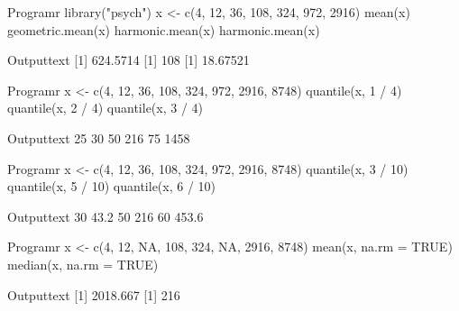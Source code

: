 \begin{code}
    {Program}{r}
library("psych")
x <- c(4, 12, 36, 108, 324, 972, 2916)
mean(x)
geometric.mean(x)
harmonic.mean(x)
harmonic.mean(x)
\end{code}
\begin{code}
    {Output}{text}
[1] 624.5714
[1] 108
[1] 18.67521
\end{code}

\begin{code}
    {Program}{r}
x <- c(4, 12, 36, 108, 324, 972, 2916, 8748)
quantile(x, 1 / 4)
quantile(x, 2 / 4)
quantile(x, 3 / 4)
\end{code}
\begin{code}
    {Output}{text}
25%
 30
50%
216
 75%
1458
\end{code}

\begin{code}
    {Program}{r}
x <- c(4, 12, 36, 108, 324, 972, 2916, 8748)
quantile(x, 3 / 10)
quantile(x, 5 / 10)
quantile(x, 6 / 10)
\end{code}
\begin{code}
    {Output}{text}
 30%
43.2
50%
216
  60%
453.6
\end{code}
\newpage
\pagestyle{fancy}

\begin{code}
    {Program}{r}
x <- c(4, 12, NA, 108, 324, NA, 2916, 8748)
mean(x, na.rm = TRUE)
median(x, na.rm = TRUE)
\end{code}
\begin{code}
    {Output}{text}
[1] 2018.667
[1] 216
\end{code}

